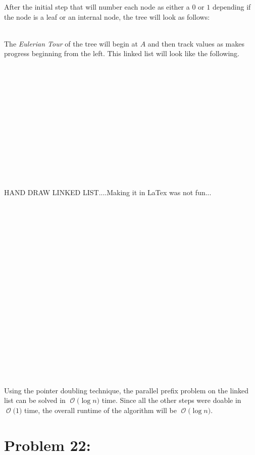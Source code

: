 \documentclass[12pt]{article}
\newcommand{\BigO}[1]{\ensuremath{\operatorname{\mathcal{O}}\bigl(#1\bigr)}}
\begin{document}
After the initial step that will number each node as either a $0$ or
$1$ depending if the node is a leaf or an internal node, the tree
will look as follows:\\\\ 
\begin{center}
\end{center} 
The \textit{Eulerian Tour} of the tree will begin at $A$ and then
track values as makes progress beginning from the left.  This linked
list will look like the following.\\\\ 
\\\\
\\\\
\\\\
\\\\
\\\\
\\\\
HAND DRAW LINKED LIST....Making it in LaTex was not fun...
\\\\
\\\\
\\\\
\\\\
\\\\
\\\\
\\\\
\\\\
\\\\
\\\\
Using the pointer doubling technique, the parallel prefix problem on
the linked list can be solved in \BigO{\log n} time.  Since all the
other steps were doable in \BigO{1} time, the overall runtime of the
algorithm will be \BigO{\log n}.


\section*{Problem 22: }
\end{document}
